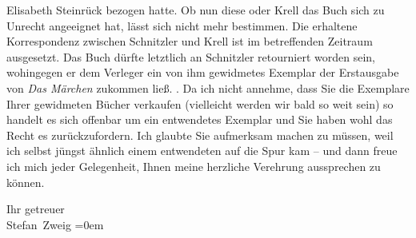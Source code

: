 {{{                     Elisabeth Steinrück bezogen hatte. Ob nun
                  diese oder Krell das Buch sich zu Unrecht
                  angeeignet hat, lässt sich nicht mehr bestimmen. Die erhaltene Korrespondenz
                  zwischen Schnitzler und Krell ist im betreffenden Zeitraum ausgesetzt. Das Buch
                  dürfte letztlich an Schnitzler retourniert
                  worden sein, wohingegen er dem Verleger ein von ihm gewidmetes Exemplar der
                  Erstausgabe von \emph{Das Märchen} zukommen ließ.
               }}}\label{K_L03665-1}. Da ich nicht annehme, dass Sie die Exemplare Ihrer gewidmeten Bücher
               verkaufen (vielleicht werden wir bald so weit sein) so handelt es sich offenbar um
               ein entwendetes Exemplar und Sie haben wohl das Recht es zurückzufordern. Ich glaubte
               Sie aufmerksam machen zu müssen, weil ich selbst jüngst ähnlich einem entwendeten
                  \label{K_L03665-2v}\label{K_L03665-2} auf die Spur
               kam – und dann freue ich mich jeder Gelegenheit, Ihnen meine herzliche Verehrung
               aussprechen zu können. \pend
           
\pstart
           Ihr getreuer{\\[\baselineskip]}\spacefill\mbox{Stefan Zweig}\pend
           \leftskip=0em{}\endnumbering{}
\begin{anhang}
\end{anhang}
      